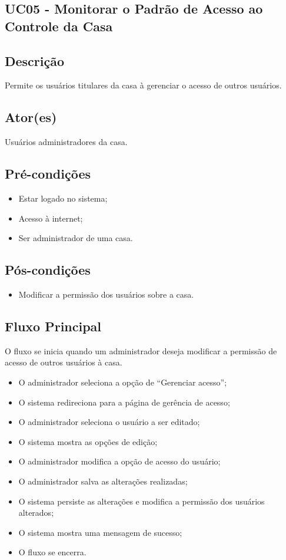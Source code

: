 \begin{anexosenv}
\section{UC05 \-- Monitorar o Padrão de Acesso ao Controle da Casa}
    \subsection{Descrição}
        Permite os usuários titulares da casa à gerenciar o acesso de outros usuários.
    \subsection{Ator(es)}
        Usuários administradores da casa.
    \subsection{Pré-condições}
        \begin{itemize}
            \item Estar logado no sistema;
            \item Acesso à internet;
            \item Ser administrador de uma casa.
        \end{itemize}
    \subsection{Pós-condições}
        \begin{itemize}
            \item Modificar a permissão dos usuários sobre a casa.
        \end{itemize}
    \subsection{Fluxo Principal}
        O fluxo se inicia quando um administrador deseja modificar a permissão de acesso de outros usuários à casa.
        \begin{itemize}
            \item O administrador seleciona a opção de “Gerenciar acesso”;
            \item O sistema redireciona para a página de gerência de acesso;
            \item O administrador seleciona o usuário a ser editado;
            \item O sistema mostra as opções de edição;
            \item O administrador modifica a opção de acesso do usuário;
            \item O administrador salva as alterações realizadas;
            \item O sistema persiste as alterações e modifica a permissão dos usuários alterados;
            \item O sistema mostra uma mensagem de sucesso;
            \item O fluxo se encerra.
        \end{itemize}


\end{anexosenv}
